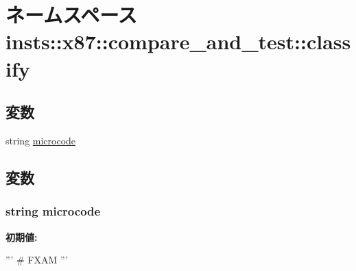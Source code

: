 \hypertarget{namespaceinsts_1_1x87_1_1compare__and__test_1_1classify}{
\section{ネームスペース insts::x87::compare\_\-and\_\-test::classify}
\label{namespaceinsts_1_1x87_1_1compare__and__test_1_1classify}
}
\subsection*{変数}
\begin{DoxyCompactItemize}
\item 
string \hyperlink{namespaceinsts_1_1x87_1_1compare__and__test_1_1classify_a770f11a173e99389a8802f0107ed8f52}{microcode}
\end{DoxyCompactItemize}


\subsection{変数}
\hypertarget{namespaceinsts_1_1x87_1_1compare__and__test_1_1classify_a770f11a173e99389a8802f0107ed8f52}{
\subsubsection[{microcode}]{\setlength{\rightskip}{0pt plus 5cm}string {\bf microcode}}}
\label{namespaceinsts_1_1x87_1_1compare__and__test_1_1classify_a770f11a173e99389a8802f0107ed8f52}
{\bfseries 初期値:}
\begin{DoxyCode}
'''
# FXAM
'''
\end{DoxyCode}
